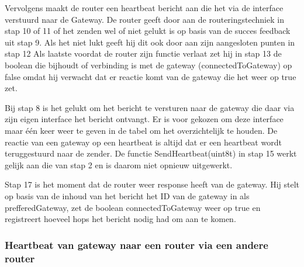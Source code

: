 \documentclass[a4paper, 11pt, oneside]{report}
\begin{document}
Vervolgens maakt de router een heartbeat bericht aan die het via de  interface verstuurd naar de Gateway.
De router geeft door aan de routeringstechniek in stap 10 of 11 of het zenden wel of niet gelukt is op basis van de succes feedback uit stap 9.
Als het niet lukt geeft hij dit ook door aan zijn aangesloten punten in stap 12 %
Als laatste voordat de router zijn functie verlaat zet hij in stap 13 de boolean die bijhoudt of verbinding is met de gateway (connectedToGateway) op false omdat hij verwacht dat er reactie komt van de gateway die het weer op true zet.

Bij stap 8 is het gelukt om het bericht te versturen naar de gateway die daar via zijn eigen  interface het bericht ontvangt.
Er is voor gekozen om deze interface maar één keer weer te geven in de tabel om het overzichtelijk te houden.
De reactie van een gateway op een heartbeat is altijd dat er een heartbeat wordt teruggestuurd naar de zender. 
De functie SendHeartbeat(uint8\textunderscore t) in stap 15 werkt gelijk aan die van stap 2 en is daarom niet opnieuw uitgewerkt.

Stap 17 is het moment dat de router weer response heeft van de gateway.
Hij stelt op basis van de inhoud van het bericht het ID van de gateway in als prefferedGateway, zet de boolean connectedToGateway weer op true en registreert hoeveel hops het bericht nodig had om aan te komen.

\subsubsection{Heartbeat van gateway naar een router via een andere router}
\label{DetailedDesign:Communicatie:sequence:heartbeatgateway->router->router}
\end{document}
